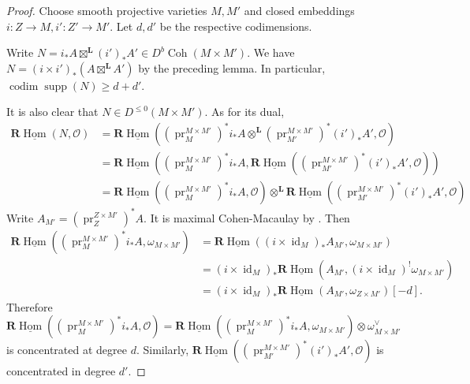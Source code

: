 \documentclass{amsart}
\theoremstyle{plain}
\theoremstyle{definition}
\theoremstyle{remark}
\begin{document}
    \begin{proof}
        Choose smooth projective varieties $M,M'$ and closed embeddings $i:Z\to M,i':Z'\to M'$.
        Let $d,d'$ be the respective codimensions.

        Write $N=i_\ast A\boxtimes^{\mathbf L}(i')_\ast A'\in D^b\operatorname{Coh}(M\times M')$.
        We have $N=(i\times i')_\ast(A\boxtimes^{\mathbf L}A')$ by the preceding lemma.
        In particular, $\operatorname{codim}\operatorname{supp}(N)\ge d+d'$.

        It is also clear that $N\in D^{\le 0}(M\times M')$.
        As for its dual,
        \begin{align*}
            \mathbf R\underline{\operatorname{Hom}}(N,\mathcal O)&=\mathbf R\underline{\operatorname{Hom}}((\operatorname{pr}_M^{M\times M'})^\ast i_\ast A\otimes^{\mathbf L}(\operatorname{pr}_{M'}^{M\times M'})^\ast (i')_\ast A',\mathcal O)\\
            &=\mathbf R\underline{\operatorname{Hom}}((\operatorname{pr}_M^{M\times M'})^\ast i_\ast A,\mathbf R\underline{\operatorname{Hom}}((\operatorname{pr}_{M'}^{M\times M'})^\ast (i')_\ast A',\mathcal O))\\
            &=\mathbf R\underline{\operatorname{Hom}}((\operatorname{pr}_M^{M\times M'})^\ast i_\ast A,\mathcal O)\otimes^{\mathbf L}\mathbf R\underline{\operatorname{Hom}}((\operatorname{pr}_{M'}^{M\times M'})^\ast (i')_\ast A',\mathcal O)
        \end{align*}
        Write $A_{M'}=(\operatorname{pr}_{Z}^{Z\times M'})^\ast A$.
        It is maximal Cohen-Macaulay by \cite[Lemma~2.3]{arinkin}.
        Then
        \begin{align*}
            \mathbf R\underline{\operatorname{Hom}}((\operatorname{pr}_M^{M\times M'})^\ast i_\ast A,\omega_{M\times M'})&=\mathbf R\underline{\operatorname{Hom}}((i\times\operatorname{id}_M)_\ast A_{M'},\omega_{M\times M'})\\
            &=(i\times\operatorname{id}_M)_\ast\mathbf R\underline{\operatorname{Hom}}(A_{M'},(i\times\operatorname{id}_M)^!\omega_{M\times M'})\\
            &=(i\times\operatorname{id}_M)_\ast\mathbf R\underline{\operatorname{Hom}}(A_{M'},\omega_{Z\times M'})[-d].
        \end{align*}
        Therefore $\mathbf R\underline{\operatorname{Hom}}((\operatorname{pr}_M^{M\times M'})^\ast i_\ast A,\mathcal O)=\mathbf R\underline{\operatorname{Hom}}((\operatorname{pr}_M^{M\times M'})^\ast i_\ast A,\omega_{M\times M'})\otimes \omega_{M\times M'}^{\vee}$ is concentrated at degree $d$.
        Similarly, $\mathbf R\underline{\operatorname{Hom}}((\operatorname{pr}_{M'}^{M\times M'})^\ast (i')_\ast A',\mathcal O)$ is concentrated in degree $d'$.


\end{proof}
\end{document}
